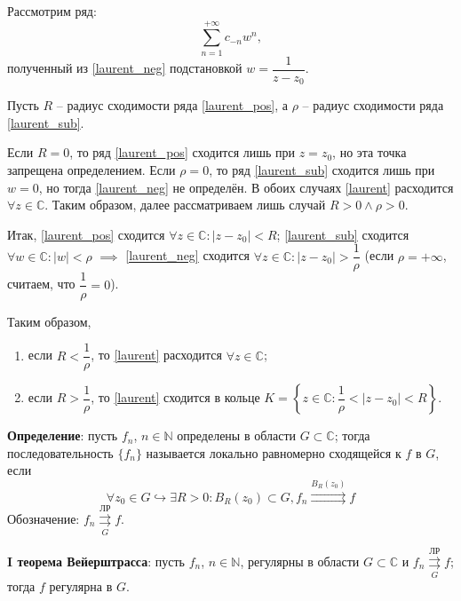 \documentclass[12pt, a4paper, reqno]{article}
\begin{document}
    Рассмотрим ряд:
    \begin{equation}\label{laurent_sub}
        \sum\limits_{n = 1}^{+\infty} c_{-n} w^n,
    \end{equation}
    полученный из \eqref{laurent_neg} подстановкой $w = \dfrac{1}{z - z_0}$.

    Пусть $R$ -- радиус сходимости ряда \eqref{laurent_pos}, а $\rho$ -- радиус сходимости ряда
    \eqref{laurent_sub}.

    Если $R = 0$, то ряд \eqref{laurent_pos} сходится лишь при $z = z_0$, но эта точка запрещена
    определением.  Если $\rho = 0$, то ряд \eqref{laurent_sub} сходится лишь при $w = 0$, но тогда
    \eqref{laurent_neg} не определён. В обоих случаях \eqref{laurent} расходится $\forall z \in \mathbb{C}$.
    Таким образом, далее рассматриваем лишь случай $R > 0 \wedge \rho > 0$.

    Итак, \eqref{laurent_pos} сходится $\forall z \in \mathbb{C}: |z - z_0| < R$; \eqref{laurent_sub}
    сходится $\forall w \in \mathbb{C}: |w| < \rho$ $\implies$ \eqref{laurent_neg} сходится
    $\forall z \in \mathbb{C}: |z - z_0| > \dfrac{1}{\rho}$ (если $\rho = +\infty$, считаем,
    что $\dfrac{1}{\rho} = 0$).

    Таким образом,
    \begin{enumerate}
        \item если $R < \dfrac{1}{\rho}$, то \eqref{laurent} расходится $\forall z \in \mathbb{C}$;
        \item если $R > \dfrac{1}{\rho}$, то \eqref{laurent} сходится в кольце
              $K = \left\{z \in \mathbb{C}: \dfrac{1}{\rho} < |z - z_0| < R\right\}$.
    \end{enumerate}

    \textbf{Определение}: пусть $f_n$, $n \in \mathbb{N}$ определены в области $G \subset \mathbb{C}$;
    тогда последовательность $\{f_n\}$ называется локально равномерно сходящейся к $f$ в $G$, если
    \begin{equation*}
        \forall z_0 \in G \hookrightarrow \exists R > 0: B_R(z_0) \subset G,
        f_n \overset{B_R(z_0)}{\rightrightarrows} f
    \end{equation*}
    Обозначение: $f_n \overset{\text{ЛР}}{\underset{G}{\rightrightarrows}} f$.

    \textbf{I теорема Вейерштрасса}: пусть $f_n$, $n \in \mathbb{N}$, регулярны в области
    $G \subset \mathbb{C}$ и $f_n \overset{\text{ЛР}}{\underset{G}{\rightrightarrows}} f$; тогда
    $f$ регулярна в $G$.
\end{document}
